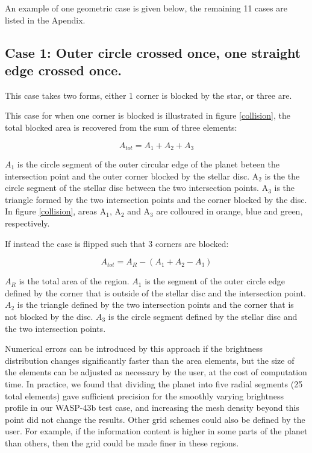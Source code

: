 \documentclass[a4paper,fleqn,usenatbib]{mnras}
\begin{document}
An example of one geometric case is given below, the remaining 11 cases are listed in the Apendix.

\subsection{Case 1: Outer circle crossed once, one straight edge crossed once.}

This case takes two forms, either 1 corner is blocked by the star, or three are.

This case for when one corner is blocked is illustrated in figure \ref{collision}, the total blocked area is recovered from the sum of three elements:

\begin{equation} \label{eq:inner_outer}
A_{tot} = A_1 + A_2 + A_3
\end{equation}

$A_1$ is the circle segment of the outer circular edge of the planet beteen the intersection point and the outer corner blocked by the stellar disc. A$_2$ is the the circle segment of the stellar disc between the two intersection points. A$_3$ is the triangle formed by the two intersection points and the corner blocked by the disc. In figure \ref{collision}, areas A$_1$, A$_2$ and A$_3$ are colloured in orange, blue and green, respectively.

If instead the case is flipped such that 3 corners are blocked:

\begin{equation} \label{eq:inner_outer}
A_{tot} = A_R - (A_1 + A_2 - A_3)
\end{equation}

$A_R$ is the total area of the region. $A_1$ is the segment of the outer circle edge defined by the corner that is outside of the stellar disc and the intersection point. $A_2$ is the triangle defined by the two intersection points and the corner that is not blocked by the disc. $A_3$ is the circle segment defined by the stellar disc and the two intersection points.

Numerical errors can be introduced by this approach if the brightness distribution changes significantly faster than the area elements, but the size of the elements can be adjusted as necessary by the user, at the cost of computation time.
In practice, we found that dividing the planet into five radial segments (25 total elements) gave sufficient precision for the smoothly varying brightness profile in our WASP-43b test case, and increasing the mesh density beyond this point did not change the results. Other grid schemes could also be defined by the user. For example, if the information content is higher in some parts of the planet than others, then the grid could be made finer in these regions.
\end{document}

